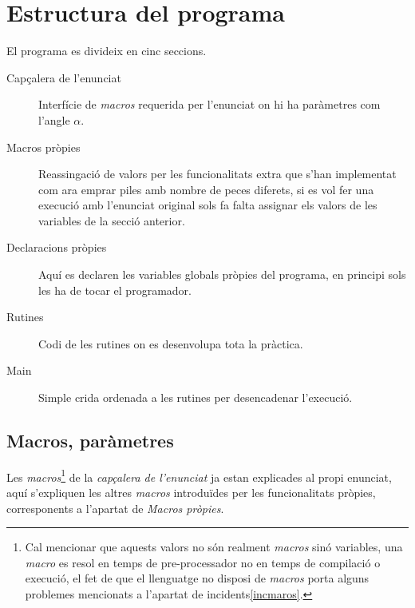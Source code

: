 \section{Estructura del programa}
El programa es divideix en cinc seccions.

\begin{description}
\item [Capçalera de l'enunciat] Interfície de \emph{macros} requerida
per l'enunciat on hi ha paràmetres com l'angle $\alpha$.

\item [Macros pròpies] Reassingació de valors per les funcionalitats extra que
s'han implementat com ara emprar piles amb nombre de peces diferets, si es vol
fer una execució amb l'enunciat original sols fa falta assignar els valors de
les variables de la secció anterior.

\item [Declaracions pròpies] Aquí es declaren les variables globals pròpies
del programa, en principi sols les ha de tocar el programador.

\item [Rutines] Codi de les rutines on es desenvolupa tota la pràctica.

\item [Main] Simple crida ordenada a les rutines per desencadenar l'execució.
\end{description}

\subsection{Macros, paràmetres}
Les \emph{macros}\footnote{Cal mencionar que aquests valors no són realment
\emph{macros} sinó variables, una \emph{macro} es resol en temps de
pre-processador no en temps de compilació o execució, el fet de que el
llenguatge no disposi de \emph{macros} porta alguns problemes mencionats
a l'apartat de incidents\ref{incmaros}.} de la \emph{capçalera de l'enunciat} 
ja estan explicades al propi enunciat, aquí s'expliquen les altres
\emph{macros} introduïdes per les funcionalitats pròpies, corresponents a
l'apartat de \emph{Macros pròpies}.

